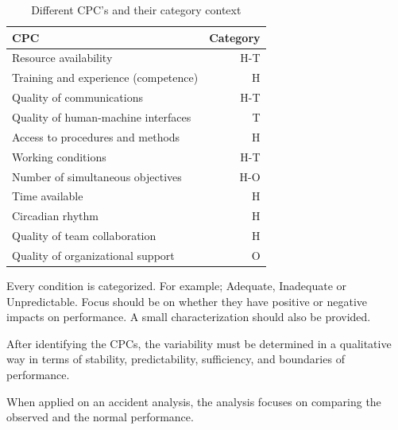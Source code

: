 \documentclass[10pt,oneside]{book}                  %
\begin{document}
\begin{table}[h]
\centering
    \begin{tabular}{ | l | r | }
    \hline
    CPC                                                      & Category \\ \hline \hline
    Resource availability                                    &     H-T  \\ \hline
    Training and experience (competence)                     &       H  \\ \hline
    Quality of communications                                &     H-T  \\ \hline
    Quality of human-machine interfaces                      &       T  \\ \hline
    Access to procedures and methods     &       H  \\ \hline
    Working conditions                                       &     H-T  \\ \hline
    Number of simultaneous objectives                        &     H-O  \\ \hline
    Time available                                           &       H  \\ \hline
    Circadian rhythm                                         &       H  \\ \hline
    Quality of team collaboration                            &       H  \\ \hline
    Quality of organizational support                        &       O  \\ \hline
    \end{tabular}
\caption{Different CPC's and their category context}
\label{table:cpcs}
\end{table}
Every condition is categorized. For example; Adequate, Inadequate or Unpredictable. Focus should be on whether they have positive or negative impacts on performance. A small characterization should also be provided.

After identifying the CPCs, the variability must be determined in a qualitative way in terms of stability, predictability, sufficiency, and boundaries of performance. 




When applied on an accident analysis, the analysis focuses on comparing the observed and the normal performance.
\end{document}
